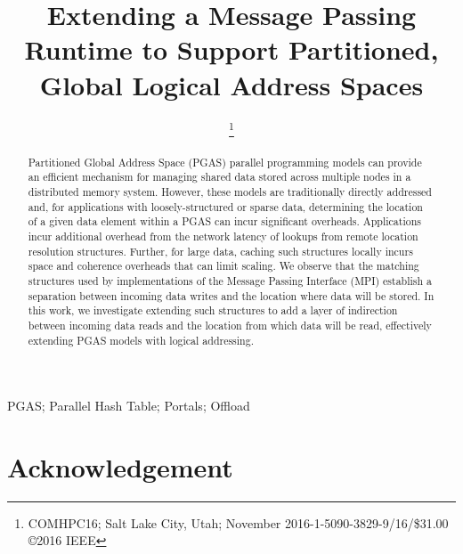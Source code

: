 \documentclass[10pt,conference]{IEEEtran}
\begin{document}
\IEEEoverridecommandlockouts
\title{Extending a Message Passing Runtime to Support Partitioned, Global Logical Address Spaces}
\author{
\and
{}
\thanks{\hspace{-1em}COMHPC16; Salt Lake City, Utah; November 2016-1-5090-3829-9/16/\$31.00 \copyright 2016 IEEE}
}

\maketitle

\begin{abstract}

Partitioned Global Address Space (PGAS) parallel programming models
can provide an efficient mechanism for managing shared data stored
across multiple nodes in a distributed memory system.  However,
these models are traditionally directly addressed and, for
applications with loosely-structured or sparse data, determining the
location of a given data element within a PGAS can incur significant
overheads.  Applications incur additional overhead from the network
latency of lookups from remote location resolution structures.
Further, for large data, caching such structures locally incurs
space and coherence overheads that can limit scaling.
%
We observe that the matching structures used by implementations of the Message
Passing Interface (MPI) establish a separation between incoming data writes and
the location where data will be stored.  In this work, we investigate extending
such structures to add a layer of indirection between incoming data reads
and the location from which data will be read, effectively extending PGAS models
with logical addressing.

\end{abstract}

\begin{IEEEkeywords}
PGAS; Parallel Hash Table; Portals; Offload
\end{IEEEkeywords}







\section*{Acknowledgement}
\end{document}

